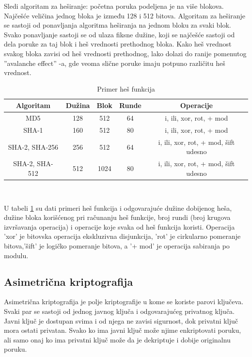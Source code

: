 \documentclass[a4paper]{article}
\begin{document}
Sledi algoritam za heširanje: početna poruka podeljena je na više blokova. Najčešće veličina jednog bloka je između 128 i 512 bitova. Algoritam za heširanje se sastoji od ponavljanja algoritma heširanja na jednom bloku za svaki blok. Svako ponavljanje sastoji se od ulaza fiksne dužine, koji se najčešće sastoji od dela poruke za taj blok i heš vrednosti prethodnog bloka. Kako heš vrednost svakog bloka zavisi od heš vrednosti prethodnog, lako dolazi do ranije pomenutog ''avalanche effect'' -a, gde veoma slične poruke imaju potpuno različitu heš vrednost.


\begin{table}[H]
\centering
 \begin{tabular}{|c| c| c| c| c|} 
 \hline
 Algoritam & Dužina & Blok & Runde & Operacije\\ [0.5ex]
 \hline
 MD5 & 128 & 512 & 64 & i, ili, xor, rot, + mod\\ 
 \hline
 SHA-1 & 160 & 512 & 80 & i, ili, xor, rot, + mod\\ 
 \hline
 SHA-2, SHA-256 & 256 & 512 & 64 & i, ili, xor, rot, + mod, šift udesno \\
  \hline
 SHA-2, SHA- 512 & 512 & 1024 & 80 & i, ili, xor, rot, + mod, šift udesno \\
 \hline
\end{tabular}\vspace{0.5cm}\\
\caption{Primer heš funkcija}
\label{fig:hash_funkcije}
\end{table}
U tabeli \ref{fig:hash_funkcije} su dati primeri heš funkcija i odgovarajuće dužine dobijenog heša, dužine bloka korišćenog pri računanju heš funkcije, broj rundi (broj krugova izvršavanja operacija) i operacije koje svaka od heš funkcija koristi. Operacija 'xor' je bitovska operacija ekskluzivna disjunkcija, 'rot' je cirkularno pomeranje bitova,'šift' je logičko pomeranje bitova, a '+ mod' je operacija sabiranja po modulu.



\subsection{Asimetrična kriptografija}
Asimetrična kriptografija je polje kriptografije u kome se koriste parovi ključeva. Svaki par se sastoji od jednog javnog ključa i odgovarajućeg privatnog ključa. Javni ključ je dostupan svima i od njega ne zavisi sigurnost, dok privatni ključ mora ostati privatan. Svako ko ima javni ključ može njime enkriptovati poruku, ali samo onaj ko ima privatni ključ može da je dekriptuje i dobije originalnu poruku. 
\end{document}
